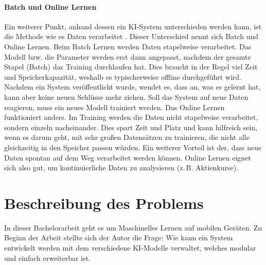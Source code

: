 \paragraph{Batch und Online Lernen}
Ein weiterer Punkt, anhand dessen ein KI-System unterschieden
werden kann, ist die Methode wie es Daten verarbeitet \parencite[15]{book:hands-on-ml}.
Dieser Unterschied nennt sich Batch und Online Lernen.
Beim Batch Lernen werden Daten stapelweise verarbeitet.
Das Modell bzw. die Parameter werden erst dann angepasst,
nachdem der gesamte Stapel (Batch) das Training durchlaufen hat.
Dies braucht in der Regel viel Zeit und Speicherkapazität, weshalb
es typischerweise offline durchgeführt wird.
Nachdem ein System veröffentlicht wurde, wendet es, dass an, was es gelernt hat,
kann aber keine neuen Schlüsse mehr ziehen.
Soll das System auf neue Daten reagieren, muss ein neues Modell trainiert werden.
Das Online Lernen funktioniert anders.
Im Training werden die Daten nicht stapelweise verarbeitet,
sondern einzeln nacheinander.
Dies spart Zeit und Platz und kann hilfreich sein, wenn es darum geht,
mit sehr großen Datensätzen zu trainieren, die nicht alle gleichzeitig
in den Speicher passen würden.
Ein weiterer Vorteil ist der, dass neue Daten spontan auf dem Weg
verarbeitet werden können. Online Lernen eignet sich also gut,
um kontinuierliche Daten zu analysieren (z.\,B. Aktienkurse).

\section{Beschreibung des Problems}
In dieser Bachelorarbeit geht es um Maschinelles Lernen auf mobilen Geräten.
Zu Beginn der Arbeit stellte sich der Autor die Frage:
Wie kann ein System entwickelt werden mit dem verschiedene KI-Modelle
verwaltet, welches modular und einfach erweiterbar ist.